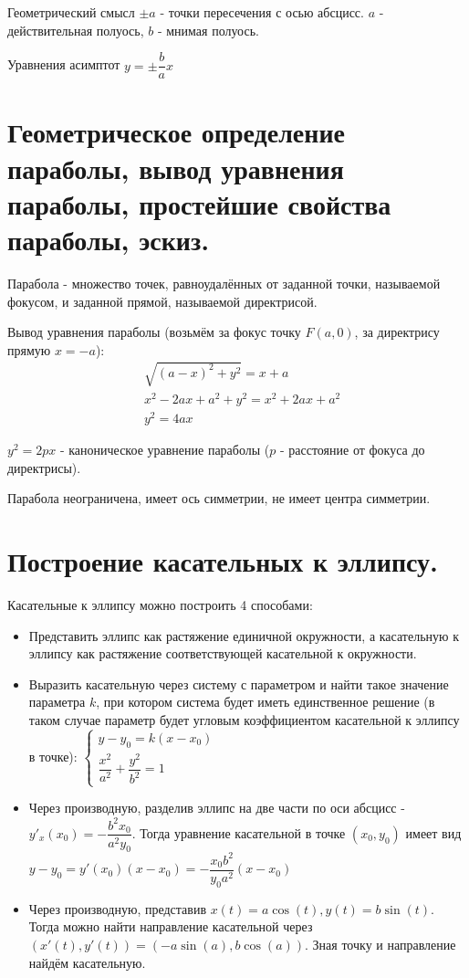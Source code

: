 \documentclass[12pt]{article}
\begin{document}
\begin{sloppypar}
    Геометрический смысл $\pm a$ - точки пересечения с осью абсцисс. $a$ - действительная полуось, $b$ - мнимая полуось.

    Уравнения асимптот $y = \pm \dfrac{b}{a}x$

    \section{Геометрическое определение параболы, вывод уравнения параболы, простейшие свойства параболы, эскиз.}
    Парабола - множество точек, равноудалённых от заданной точки, называемой фокусом, и заданной прямой, называемой директрисой.

    Вывод уравнения параболы (возьмём за фокус точку $F(a, 0)$, за директрису прямую $x = -a$):
    \begin{align*}
         & \sqrt{(a - x)^2 + y^2} = x + a          \\
         & x^2 - 2ax + a^2 + y^2 = x^2 + 2ax + a^2 \\
         & y^2 = 4ax
    \end{align*}

    $y^2 = 2px$ - каноническое уравнение параболы ($p$ - расстояние от фокуса до директрисы).

    Парабола неограничена, имеет ось симметрии, не имеет центра симметрии.

    \section{Построение касательных к эллипсу.}
    Касательные к эллипсу можно построить 4 способами:
    \begin{itemize}
        \item Представить эллипс как растяжение единичной окружности, а касательную к эллипсу как растяжение соответствующей касательной к окружности.
        \item Выразить касательную через систему с параметром и найти такое значение параметра $k$, при котором система будет иметь единственное решение (в таком случае параметр будет угловым коэффициентом касательной к эллипсу в точке):
              $\begin{cases}
                      y - y_0 = k(x - x_0) \\
                      \dfrac{x^2}{a^2} + \dfrac{y^2}{b^2} = 1
                  \end{cases}$
        \item Через производную, разделив эллипс на две части по оси абсцисс - $y'_x(x_0) = -\dfrac{b^2x_0}{a^2y_0}$. Тогда уравнение касательной в точке $(x_0, y_0)$ имеет вид $y - y_0 = y'(x_0)(x - x_0) = -\dfrac{x_0b^2}{y_0a^2}(x - x_0)$
        \item Через производную, представив $x(t) = a\cos(t), y(t) = b\sin(t)$. Тогда можно найти направление касательной через $(x'(t), y'(t)) = (-a\sin(a), b\cos(a))$. Зная точку и направление найдём касательную.
    \end{itemize}


\end{sloppypar}
\end{document}
